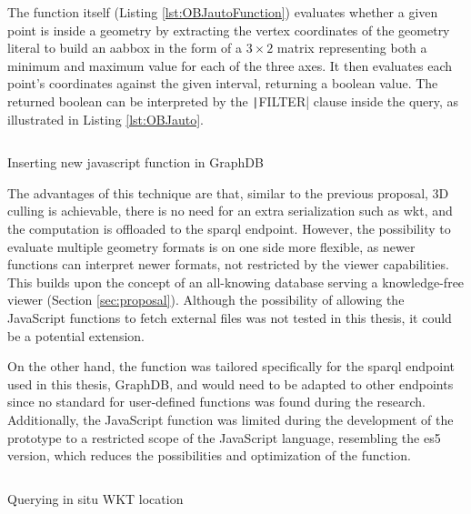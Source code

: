 The function itself (Listing \ref{lst:OBJautoFunction}) evaluates whether a given point is inside a geometry by extracting the vertex coordinates of the geometry literal to build an \ac{aabbox} in the form of a $3\times2$ matrix representing both a minimum and maximum value for each of the three axes. It then evaluates each point's coordinates against the given interval, returning a boolean value. The returned boolean can be interpreted by the \texttt|FILTER| clause inside the query, as illustrated in Listing \ref{lst:OBJauto}.

\begin{listing}[H]
    \inputminted{sparql}{dynamicQueries/inQuery/insert.rq}
    \vspace{-0.7cm}
    \caption{Inserting new javascript function in GraphDB}
    \label{lst:graphdbNewFunction}
\end{listing}

The advantages of this technique are that, similar to the previous proposal, 3D culling is achievable, there is no need for an extra serialization such as \ac{wkt}, and the computation is offloaded to the \ac{sparql} endpoint. However, the possibility to evaluate multiple geometry formats is on one side more flexible, as newer functions can interpret newer formats, not restricted by the viewer capabilities. This builds upon the concept of an all-knowing database serving a knowledge-free viewer (Section \ref{sec:proposal}). Although the possibility of allowing the JavaScript functions to fetch external files was not tested in this thesis, it could be a potential extension.

On the other hand, the function was tailored specifically for the \ac{sparql} endpoint used in this thesis, GraphDB, and would need to be adapted to other endpoints since no standard for user-defined functions was found during the research. Additionally, the JavaScript function was limited during the development of the prototype to a restricted scope of the JavaScript language, resembling the \ac{es5} version, which reduces the possibilities and optimization of the function.
\begin{listing}[H]
    \inputminted{js}{dynamicQueries/inQuery/function.js}
    \vspace{-0.7cm}
    \caption{Querying in situ WKT location}
    \label{lst:OBJautoFunction}
\end{listing}

